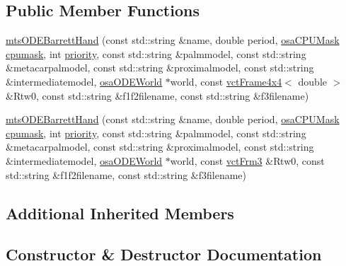 \subsection*{Public Member Functions}
\begin{DoxyCompactItemize}
\item 
\hyperlink{classmts_o_d_e_barrett_hand_ae6f124bb20f84c8e6f2d045351cf78dd}{mts\+O\+D\+E\+Barrett\+Hand} (const std\+::string \&name, double period, \hyperlink{osa_c_p_u_affinity_8h_aaec7cdd7797e5e6eb5438c15fee5477a}{osa\+C\+P\+U\+Mask} \hyperlink{classmts_o_d_e_manipulator_task_aaff55dbeff38e947707c6b3405041622}{cpumask}, int \hyperlink{classmts_o_d_e_manipulator_task_ae2b16e466e4d216b2cf13ae89414696a}{priority}, const std\+::string \&palmmodel, const std\+::string \&metacarpalmodel, const std\+::string \&proximalmodel, const std\+::string \&intermediatemodel, \hyperlink{classosa_o_d_e_world}{osa\+O\+D\+E\+World} $\ast$world, const \hyperlink{classvct_frame4x4}{vct\+Frame4x4}$<$ double $>$ \&Rtw0, const std\+::string \&f1f2filename, const std\+::string \&f3filename)
\item 
\hyperlink{classmts_o_d_e_barrett_hand_ae6c8889a3762267377bfd05ae7c4a011}{mts\+O\+D\+E\+Barrett\+Hand} (const std\+::string \&name, double period, \hyperlink{osa_c_p_u_affinity_8h_aaec7cdd7797e5e6eb5438c15fee5477a}{osa\+C\+P\+U\+Mask} \hyperlink{classmts_o_d_e_manipulator_task_aaff55dbeff38e947707c6b3405041622}{cpumask}, int \hyperlink{classmts_o_d_e_manipulator_task_ae2b16e466e4d216b2cf13ae89414696a}{priority}, const std\+::string \&palmmodel, const std\+::string \&metacarpalmodel, const std\+::string \&proximalmodel, const std\+::string \&intermediatemodel, \hyperlink{classosa_o_d_e_world}{osa\+O\+D\+E\+World} $\ast$world, const \hyperlink{vct_transformation_types_8h_a81feda0a02c2d1bc26e5553f409fed20}{vct\+Frm3} \&Rtw0, const std\+::string \&f1f2filename, const std\+::string \&f3filename)
\end{DoxyCompactItemize}
\subsection*{Additional Inherited Members}


\subsection{Constructor \& Destructor Documentation}
\hypertarget{classmts_o_d_e_barrett_hand_ae6f124bb20f84c8e6f2d045351cf78dd}{}
